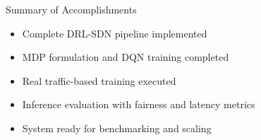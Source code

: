 \begin{frame}{Summary of Accomplishments}
\begin{itemize}
    \item Complete DRL-SDN pipeline implemented
    \item MDP formulation and DQN training completed
    \item Real traffic-based training executed
    \item Inference evaluation with fairness and latency metrics
    \item System ready for benchmarking and scaling
\end{itemize}
\end{frame}
